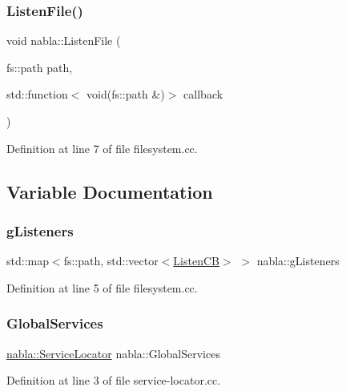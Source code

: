 \subsubsection{\texorpdfstring{ListenFile()}{ListenFile()}}
{\footnotesize\ttfamily void nabla\+::\+Listen\+File (\begin{DoxyParamCaption}\item[{fs\+::path}]{path,  }\item[{std\+::function$<$ void(fs\+::path \&)$>$}]{callback }\end{DoxyParamCaption})}



Definition at line 7 of file filesystem.\+cc.



\subsection{Variable Documentation}
\mbox{\label{namespacenabla_abc8c0b4e42511a328da34e4f82ef92da}} 
\subsubsection{\texorpdfstring{gListeners}{gListeners}}
{\footnotesize\ttfamily std\+::map$<$fs\+::path, std\+::vector$<$\mbox{\hyperlink{namespacenabla_abd03676c495fab67cc7ac9b90e31c152}{Listen\+CB}}$>$ $>$ nabla\+::g\+Listeners}



Definition at line 5 of file filesystem.\+cc.

\mbox{\label{namespacenabla_ac9094e134a73575efe47915c9f6b10fc}} 
\subsubsection{\texorpdfstring{GlobalServices}{GlobalServices}}
{\footnotesize\ttfamily \mbox{\hyperlink{classnabla_1_1_service_locator}{nabla\+::\+Service\+Locator}} nabla\+::\+Global\+Services}



Definition at line 3 of file service-\/locator.\+cc.

